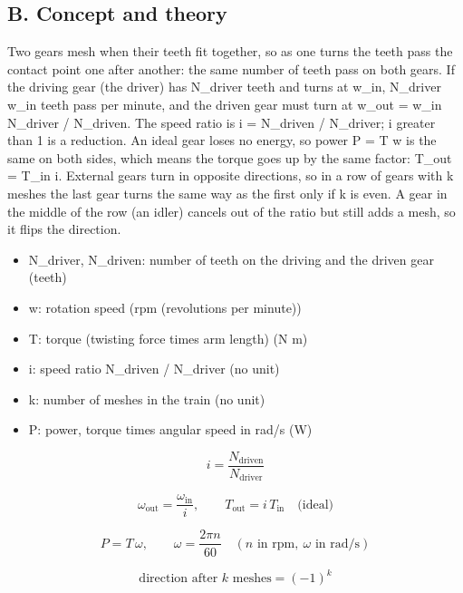 \documentclass[11pt,a4paper]{article}
\begin{document}
\subsection*{B. Concept and theory}
Two gears mesh when their teeth fit together, so as one turns the teeth pass the contact point one after another: the same number of teeth pass on both gears. If the driving gear (the driver) has N\_driver teeth and turns at w\_in, N\_driver w\_in teeth pass per minute, and the driven gear must turn at w\_out = w\_in N\_driver / N\_driven. The speed ratio is i = N\_driven / N\_driver; i greater than 1 is a reduction. An ideal gear loses no energy, so power P = T w is the same on both sides, which means the torque goes up by the same factor: T\_out = T\_in i. External gears turn in opposite directions, so in a row of gears with k meshes the last gear turns the same way as the first only if k is even. A gear in the middle of the row (an idler) cancels out of the ratio but still adds a mesh, so it flips the direction.

\begin{itemize}[nosep]
\item N\_driver, N\_driven: number of teeth on the driving and the driven gear (teeth)
\item w: rotation speed (rpm (revolutions per minute))
\item T: torque (twisting force times arm length) (N m)
\item i: speed ratio N\_driven / N\_driver (no unit)
\item k: number of meshes in the train (no unit)
\item P: power, torque times angular speed in rad/s (W)
\end{itemize}

\begin{equation*}
i=\frac{N_\mathrm{driven}}{N_\mathrm{driver}}
\end{equation*}

\begin{equation*}
\omega_\mathrm{out}=\frac{\omega_\mathrm{in}}{i},\qquad T_\mathrm{out}=i\,T_\mathrm{in}\quad\text{(ideal)}
\end{equation*}

\begin{equation*}
P=T\,\omega,\qquad \omega=\frac{2\pi n}{60}\quad(n\text{ in rpm},\ \omega\text{ in rad/s})
\end{equation*}

\begin{equation*}
\text{direction after }k\text{ meshes}=(-1)^k
\end{equation*}
\end{document}
